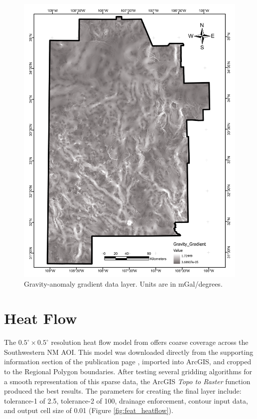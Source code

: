 \begin{figure}[H]
\centering
\includegraphics[width=0.75\linewidth]{templates/images/Figure-GravityGradient.pdf}
\caption[Gravity anomaly gradient data layer]{Gravity-anomaly gradient data layer. Units are in mGal/degrees.}
\label{fig:feat_gravity_gradient}
\end{figure}
\pagebreak

\section{Heat Flow}\label{app:dl_heat_flow}
The \(0.5^\circ\times0.5^\circ\) resolution heat flow model from \citet{lucazeau_analysis_2019} offers coarse coverage across the Southwestern NM AOI. This model was downloaded directly from the supporting information section of the publication page \citep{lucazeau_analysis_2019}, imported into ArcGIS, and cropped to the Regional Polygon boundaries. After testing several gridding algorithms for a smooth representation of this sparse data, the ArcGIS \textit{Topo to Raster} function produced the best results. The parameters for creating the final layer include: tolerance-1 of 2.5, tolerance-2 of 100, drainage enforcement, contour input data, and output cell size of 0.01 (Figure \ref{fig:feat_heatflow}).
\vfill
\pagebreak

